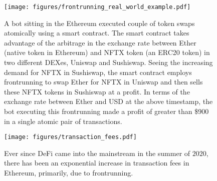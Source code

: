 \documentclass{article}
\begin{document}
\begin{figure}
    \centering
    \texttt{[image: figures/frontrunning\_real\_world\_example.pdf]}
    \caption{A bot sitting in the {\sf Ethereum} executed couple of token swaps atomically using a smart contract. The smart contract takes advantage of the arbitrage in the exchange rate between Ether (native token in {\sf Ethereum}) and NFTX token (an ERC20 token) in two different DEXes, Uniswap and Sushiswap. Seeing the increasing demand for NFTX in Sushiswap, the smart contract employs frontrunning to swap Ether for NFTX in Uniswap and then sells these NFTX tokens in Sushiswap at a profit. In terms of the exchange rate between Ether and USD at the above timestamp, the bot executing this frontrunning made a profit of greater than \$900 in a single atomic pair of transactions.}
    \label{fig:frontrunning-real-world}
\end{figure}
\begin{figure}
    \centering
    \texttt{[image: figures/transaction\_fees.pdf]}
    \caption{Ever since DeFi came into the mainstream in the summer of $2020$, there has been an exponential increase in transaction fees in {\sf Ethereum}, primarily, due to frontrunning.}
    \label{fig:transaction-fees}
\end{figure}
\end{document}
